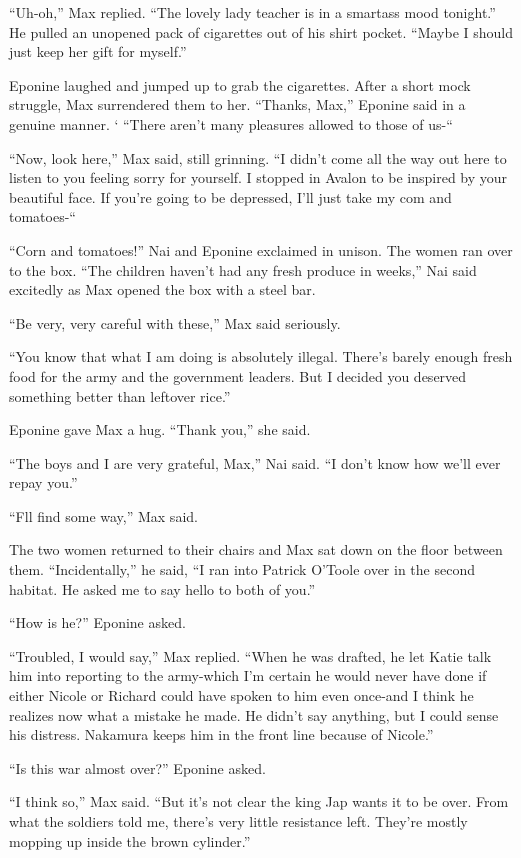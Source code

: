 \documentclass[]{article}
\begin{document}
{{“Uh-oh,” Max replied. “The lovely lady teacher is in a smartass mood tonight.” He pulled an unopened pack of cigarettes out of his shirt pocket. “Maybe I should just keep her gift for myself.”

Eponine laughed and jumped up to grab the cigarettes. After a short mock struggle, Max surrendered them to her. “Thanks, Max,” Eponine said in a genuine manner. ‘ “There aren’t many pleasures allowed to those of us-“

“Now, look here,” Max said, still grinning. “I didn’t come all the way out here to listen to you feeling sorry for yourself. I stopped in Avalon to be inspired by your beautiful face. If you’re going to be depressed, I’ll just take my com and tomatoes-“

“Corn and tomatoes!” Nai and Eponine exclaimed in unison. The women ran over to the box. “The children haven’t had any fresh produce in weeks,” Nai said excitedly as Max opened the box with a steel bar.

“Be very, very careful with these,” Max said seriously.

“You know that what I am doing is absolutely illegal. There’s barely enough fresh food for the army and the government leaders. But I decided you deserved something better than leftover rice.”

Eponine gave Max a hug. “Thank you,” she said.

“The boys and I are very grateful, Max,” Nai said. “I don’t know how we’ll ever repay you.”

“Fll find some way,” Max said.

The two women returned to their chairs and Max sat down on the floor between them. “Incidentally,” he said, “I ran into Patrick O’Toole over in the second habitat. He asked me to say hello to both of you.”

“How is he?” Eponine asked.

“Troubled, I would say,” Max replied. “When he was drafted, he let Katie talk him into reporting to the army-which I’m certain he would never have done if either Nicole or Richard could have spoken to him even once-and I think he realizes now what a mistake he made. He didn’t say anything, but I could sense his distress. Nakamura keeps him in the front line because of Nicole.”

“Is this war almost over?” Eponine asked.

“I think so,” Max said. “But it’s not clear the king Jap wants it to be over. From what the soldiers told me, there’s very little resistance left. They’re mostly mopping up inside the brown cylinder.”

}}
\end{document}
